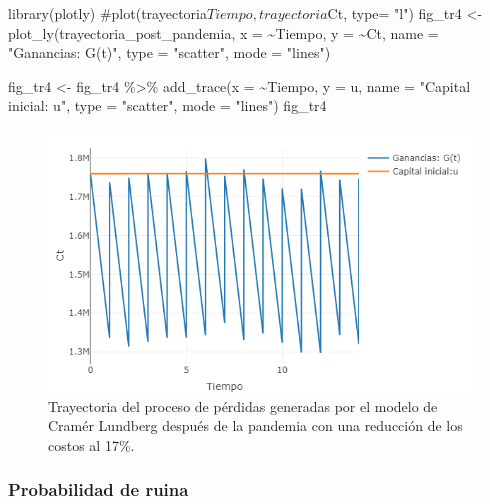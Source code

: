 \documentclass[
  us-letterpaper,
]{scrreprt}
\newenvironment{Shaded}{\begin{snugshade}}{\end{snugshade}}
\newcommand{\AttributeTok}[1]{\textcolor[rgb]{0.40,0.45,0.13}{#1}}
\newcommand{\CommentTok}[1]{\textcolor[rgb]{0.37,0.37,0.37}{#1}}
\newcommand{\FunctionTok}[1]{\textcolor[rgb]{0.28,0.35,0.67}{#1}}
\newcommand{\NormalTok}[1]{\textcolor[rgb]{0.00,0.23,0.31}{#1}}
\newcommand{\OtherTok}[1]{\textcolor[rgb]{0.00,0.23,0.31}{#1}}
\newcommand{\SpecialCharTok}[1]{\textcolor[rgb]{0.37,0.37,0.37}{#1}}
\newcommand{\StringTok}[1]{\textcolor[rgb]{0.13,0.47,0.30}{#1}}
\theoremstyle{definition}
\theoremstyle{plain}
\theoremstyle{plain}
\theoremstyle{remark}
\begin{document}
\begin{Shaded}
\begin{Highlighting}[]
\FunctionTok{library}\NormalTok{(plotly)}
\CommentTok{\#plot(trayectoria$Tiempo, trayectoria$Ct, type= "l")}
\NormalTok{fig\_tr4 }\OtherTok{\textless{}{-}} \FunctionTok{plot\_ly}\NormalTok{(trayectoria\_post\_pandemia, }\AttributeTok{x =} \SpecialCharTok{\textasciitilde{}}\NormalTok{Tiempo, }
                   \AttributeTok{y =} \SpecialCharTok{\textasciitilde{}}\NormalTok{Ct, }
         \AttributeTok{name =} \StringTok{"Ganancias: G(t)"}\NormalTok{,}
         \AttributeTok{type =} \StringTok{"scatter"}\NormalTok{, }\AttributeTok{mode =} \StringTok{"lines"}\NormalTok{)}

\NormalTok{fig\_tr4 }\OtherTok{\textless{}{-}}\NormalTok{ fig\_tr4 }\SpecialCharTok{\%\textgreater{}\%} \FunctionTok{add\_trace}\NormalTok{(}\AttributeTok{x =} \SpecialCharTok{\textasciitilde{}}\NormalTok{Tiempo, }\AttributeTok{y =}\NormalTok{ u,}
        \AttributeTok{name =} \StringTok{"Capital inicial: u"}\NormalTok{, }
        \AttributeTok{type =} \StringTok{"scatter"}\NormalTok{, }\AttributeTok{mode =} \StringTok{"lines"}\NormalTok{)}
\NormalTok{fig\_tr4}
\end{Highlighting}
\end{Shaded}

\begin{figure}[H]

{\centering \includegraphics{trayectoria4pdf.png}

}

\caption{Trayectoria del proceso de pérdidas generadas por el modelo de
Cramér Lundberg después de la pandemia con una reducción de los costos
al 17\%.}

\end{figure}%

\subsubsection{Probabilidad de ruina}\label{probabilidad-de-ruina-1}
\end{document}
